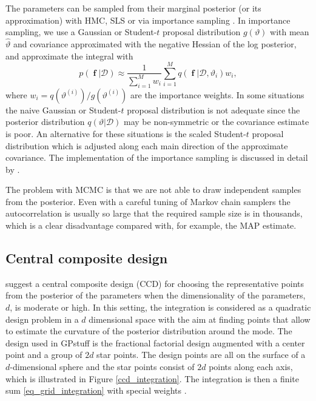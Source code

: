 \documentclass[twoside,11pt]{article}
\DeclareMathOperator{\f}{\mathbf{f}}
\newcommand{\pkg}[1]{{\fontseries{b}\selectfont #1}}
\begin{document}
The parameters can be sampled from their marginal posterior (or its
approximation) with HMC, SLS \citep{Neal:2003} or via importance
sampling \citep{Geweke:1989}. In importance sampling, we use a
Gaussian or Student-$t$ proposal distribution $g(\vartheta)$ with mean
$\hat{\vartheta}$ and covariance approximated with the negative
Hessian of the log posterior, and approximate the integral with
%
\begin{equation}
p(\f|\mathcal{D}) \approx \frac{1}{\sum_{i=1}^M w_i} \sum_{i=1}^M
q(\f|\mathcal{D}, \vartheta_i) w_i, 
\end{equation}
%
where $w_i = q(\vartheta^{(i)})/g(\vartheta^{(i)})$ are the importance
weights. In some situations the naive Gaussian or Student-$t$ proposal
distribution is not adequate since the posterior distribution
$q(\vartheta|\mathcal{D})$ may be non-symmetric or the covariance
estimate is poor. An alternative for these situations is the scaled
Student-$t$ proposal distribution \citep{Geweke:1989} which is
adjusted along each main direction of the approximate covariance. The
implementation of the importance sampling is discussed in detail by
\citet{Vanhatalo+Pietilainen+Vehtari:2010}.

The problem with MCMC is that we are not able to draw independent
samples from the posterior. Even with a careful tuning of Markov chain
samplers the autocorrelation is usually so large that the required
sample size is in thousands, which is a clear disadvantage compared
with, for example, the MAP estimate.

\subsection{Central composite design}\label{sec_CCD_integration}

\citet{Rue+Martino+Chopin:2009} suggest a central composite design
(CCD) for choosing the representative points from the posterior of the
parameters when the dimensionality of the parameters, $d$, is moderate
or high. In this setting, the integration is considered as a quadratic
design problem in a $d$ dimensional space with the aim at finding
points that allow to estimate the curvature of the posterior
distribution around the mode. The design used in \pkg{GPstuff} is the
fractional factorial design \citep{Sanchez+Sanchez:2005} augmented
with a center point and a group of $2d$ star points.  The design
points are all on the surface of a $d$-dimensional sphere and the star
points consist of $2d$ points along each axis, which is illustrated in
Figure \ref{ccd_integration}.  The integration is then a finite sum
\eqref{eq_grid_integration} with special weights
\citep{Vanhatalo+Pietilainen+Vehtari:2010}.
\end{document}
